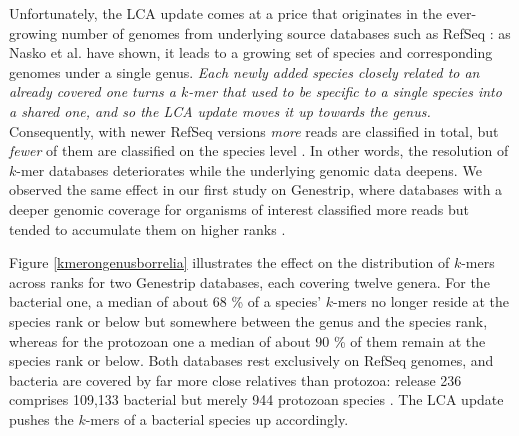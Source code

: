 \documentclass[pdflatex,sn-vancouver-num]{sn-jnl}
\begin{document}
Unfortunately, the LCA update comes at a price that originates in the ever-growing number of genomes from underlying source databases such as RefSeq \citep{10.1093/nar/gkae1038, refseqstats}: as Nasko et al. \citep{Nasko:2018aa} have shown, it leads to a growing set of species and corresponding genomes under a single genus.
    \emph{Each newly added species closely related to an already covered one turns a $k$-mer that used to be specific to a single species into a shared one, and so the LCA update moves it up towards the genus.} Consequently, with newer RefSeq versions \emph{more} reads are classified in total, but \emph{fewer} of them are classified on the species level \citep{Nasko:2018aa}. In other words, the resolution of $k$-mer databases deteriorates while the underlying genomic data deepens.
    We observed the same effect in our first study on Genestrip, where databases with a deeper genomic coverage for organisms of interest classified more reads but tended to accumulate them on higher ranks \citep{genestrip-pub}.


Figure \ref{kmerongenusborrelia} illustrates the effect on the distribution of $k$-mers across ranks for two Genestrip databases, each covering twelve genera. For the bacterial one, a median of about 68 \% of a species' $k$-mers no longer reside at the species rank or below but somewhere between the genus and the species rank, whereas for the protozoan one a median of about 90 \% of them remain at the species rank or below.
    Both databases rest exclusively on RefSeq genomes, and bacteria are covered by far more close relatives than protozoa: release 236 comprises 109,133 bacterial but merely 944 protozoan species \citep{refseqstats}. The LCA update pushes the $k$-mers of a bacterial species up accordingly.
\end{document}
